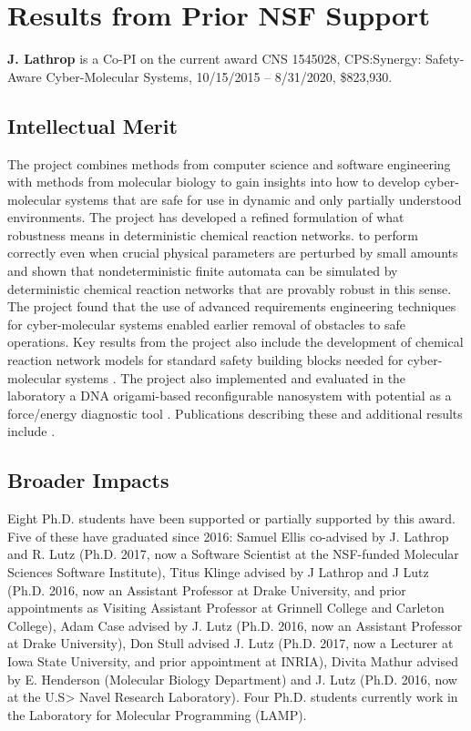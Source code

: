 
\section{Results from Prior NSF Support}

{\bf J. Lathrop} is a Co-PI on the current award CNS 1545028, CPS:Synergy: Safety-Aware Cyber-Molecular Systems, 10/15/2015 -- 8/31/2020, \$823,930.

\subsection*{Intellectual Merit}
The project combines methods from computer science and software engineering with methods from molecular biology to gain insights into how to develop cyber-molecular systems that are safe for use in dynamic and only partially understood environments.
The project has developed a refined formulation of what robustness means in deterministic chemical reaction networks. to  perform correctly even when crucial physical parameters are perturbed by small amounts and shown that nondeterministic finite automata can be simulated by deterministic chemical reaction networks that are provably robust in this sense.  
The project found that the use of advanced requirements engineering techniques for cyber-molecular systems enabled earlier removal of obstacles to safe operations.  Key results from the project also include the development of chemical reaction network models for standard safety building blocks needed for cyber-molecular systems \cite{oKlLaLu15,  cElLaLu17, cElKlLa17, jEKLLLM17}.
The project also implemented and evaluated in the laboratory a DNA origami-based reconfigurable nanosystem with potential as a force/energy diagnostic tool \cite{jMatHen16, oMath16}.    Publications describing these and additional results include \cite{cKlin16,  cHuaStu16, jCaLuSt18, cElKlLa17,  jHKLLL18}.        

\subsection*{Broader Impacts}
Eight Ph.D. students have been supported or partially supported by this award. Five of these have graduated since 2016:  Samuel Ellis co-advised by J. Lathrop and R. Lutz (Ph.D. 2017, now a Software Scientist at the NSF-funded Molecular Sciences Software Institute), Titus Klinge advised by J Lathrop and J Lutz  (Ph.D. 2016, now an Assistant Professor at Drake University, and prior appointments as Visiting Assistant Professor at Grinnell College and Carleton College), Adam Case advised by J. Lutz (Ph.D. 2016, now an Assistant Professor at Drake University), Don Stull advised J. Lutz (Ph.D. 2017, now a Lecturer at Iowa State University, and prior appointment at INRIA), Divita Mathur advised by E. Henderson (Molecular Biology Department) and J. Lutz (Ph.D. 2016, now at the U.S> Navel Research Laboratory).  Four Ph.D. students currently work in the Laboratory for Molecular Programming (LAMP).  

